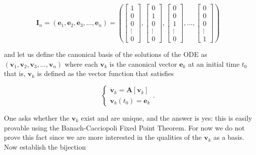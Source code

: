 \begin{equation} \mathbf{I}_n = \left(\mathbf{e}_1,\mathbf{e}_2,\mathbf{e}_3,...,\mathbf{e}_n\right) = \left( \left[\begin{array}{c} 1 \\[3mm] 0 \\[3mm] 0 \\[3mm] \vdots \\[3mm] 0 \end{array}\right], \left[\begin{array}{c} 0 \\[3mm] 1 \\[3mm] 0 \\[3mm] \vdots \\[3mm] 0 \end{array}\right], \left[\begin{array}{c} 0 \\[3mm] 0 \\[3mm] 1 \\[3mm] \vdots \\[3mm] 0 \end{array}\right], ..., \left[\begin{array}{c} 0 \\[3mm] 0 \\[3mm] 0 \\[3mm] \vdots \\[3mm] 1 \end{array}\right] \right) \label{eq:canonical_basis_complex}\end{equation}

	\noindent and let us define the canonical  basis of the solutions of the ODE as $\left(\mathbf{v}_1,\mathbf{v}_2,\mathbf{v}_3,...,\mathbf{v}_n\right)$ where each $\mathbf{v}_k$ is the canonical vector $\mathbf{e}_k$ at an initial time $t_0$ that is, $\mathbf{v}_k$ is defined as the vector function that satisfies

\begin{equation} \left\{\begin{array}{l} \dot{\mathbf{v}}_k = \mathbf{A}\left[\mathbf{v}_k\right] \\[3mm] \mathbf{v}_k\left(t_0\right) = \mathbf{e}_k \end{array}\right. .\end{equation}

	One asks whether the $\mathbf{v}_k$ exist and are unique, and the answer is yes: this is easily provable using the Banach-Cacciopoli Fixed Point Theorem. For now we do not prove this fact since we are more interested in the qualities of the $\mathbf{v}_k$ as a basis. Now establish the bijection

